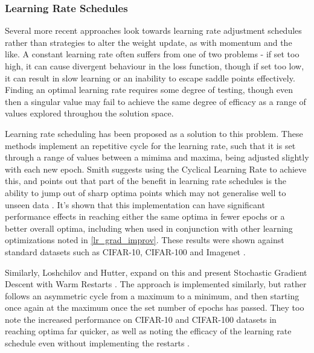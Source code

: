 \documentclass[a4paper,11pt,oneside]{article}
\theoremstyle{plain}
\theoremstyle{definition}
\begin{document}
	
	
	\subsubsection{Learning Rate Schedules}
	
	Several more recent approaches look towards learning rate adjustment schedules rather than strategies to alter the 
	weight update, as with momentum and the like. A constant learning rate often suffers from one of two problems - 
	if set too high, it can cause divergent behaviour in the loss function, though if set too low, it can result in slow 
	learning or an inability to escape saddle points effectively. Finding an optimal learning rate requires some degree
	of testing, though even then a singular value may fail to achieve the same degree of efficacy as a range of values 
	explored throughou the solution space. \newline
	
	Learning rate scheduling has been proposed as a solution to this problem. These methods implement an repetitive cycle 
	for the learning rate, such that it is set through a range of values between a mimima and maxima, being adjusted slightly 
	with each new epoch. Smith suggests using the Cyclical Learning Rate to achieve this, and points out that part of the benefit 
	in learning rate schedules is the ability to jump out of sharp optima points which may not generalise well to unseen data \cite{Smith}. 
	It's shown that this implementation can have significant performance effects in reaching either the same optima in fewer epochs or a better 
	overall optima, including when used in conjunction with other learning optimizations noted in \ref{lr_grad_improv}. These results were 
	shown against standard datasets such as CIFAR-10, CIFAR-100 and Imagenet \cite{Smith}. \newline
	
	Similarly, Loshchilov and Hutter, expand on this and present Stochastic Gradient Descent with Warm Restarts \cite{Loshchilov}. The approach is 
	implemented similarly, but rather follows an asymmetric cycle from a maximum to a minimum, and then starting once again at the maximum once the set number 
	of epochs has passed. They too note the increased performance on CIFAR-10 and CIFAR-100 datasets in reaching optima far quicker, as well as noting the efficacy of the 
	learning rate schedule even without implementing the restarts \cite{Loshchilov}.
	
	
	
\end{document}
